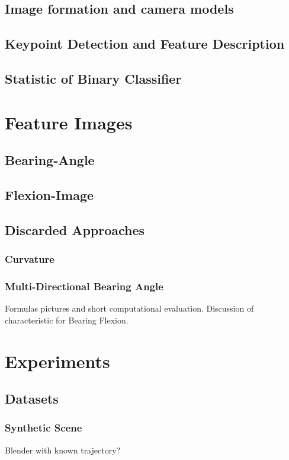 \subsection{Image formation and camera models}

\subsection{Keypoint Detection and Feature Description}
\subsection{Statistic of Binary Classifier}

\section{Feature Images}

\subsection{Bearing-Angle}
\subsection{Flexion-Image}
\subsection{Discarded Approaches}
\subsubsection{Curvature}
\subsubsection{Multi-Directional Bearing Angle}

Formulas pictures and short computational evaluation.
Discussion of characteristic for Bearing Flexion.

\section{Experiments}

\subsection{Datasets}
\subsubsection{Synthetic Scene}
Blender with known trajectory?
